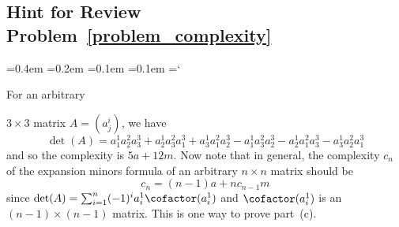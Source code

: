 
\subsection*{Hint for Review Problem~\ref{problem_complexity}}

{\ttfamily
{}\font=0.4em
\font=0.2em
\font=0.1em
\font=0.1em
\hyphenchar\font=`\-


\hypertarget{scripts_properties_of_determinant_hint}{For an arbitrary} $3 \times 3$ matrix $A = (a^i_j)$, we have
\[
\det(A) = a^1_1 a^2_2 a^3_3 + a^1_2 a^2_3 a^3_1 + a^1_3 a^2_1 a^3_2 - a^1_1 a^2_3 a^3_2 - a^1_2 a^2_1 a^3_3 - a^1_3 a^2_2 a^3_1
\]
and so the complexity is $5a + 12m$. Now note that in general, the complexity $c_n$ of the expansion minors formula of an arbitrary $n \times n$ matrix should be
\[
c_n = (n-1) a + n c_{n-1} m
\]
since $\det(A) = \sum_{i=1}^n (-1)^i a_i^1 \cofactor(a_i^1)$ and $\cofactor(a_i^1)$ is an $(n-1) \times (n-1)$ matrix. This is one way to prove part~(c).

} %

\newpage
